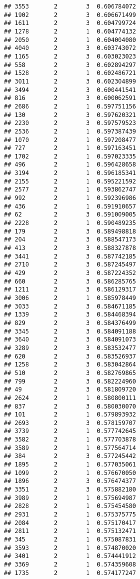 \documentclass[
]{article}
\begin{document}
\begin{verbatim}
## 3553       2        3  0.606784072
## 1902       2        3  0.606671499
## 1611       2        3  0.604799724
## 1278       2        1  0.604774132
## 2050       2        1  0.604004080
## 4040       2        3  0.603743072
## 1165       2        3  0.603023023
## 558        2        3  0.602894297
## 1528       2        1  0.602486721
## 3011       2        3  0.602304899
## 3494       2        3  0.600441541
## 816        2        3  0.600062591
## 2686       2        1  0.597751156
## 130        2        3  0.597620321
## 2230       2        3  0.597579523
## 2536       2        1  0.597387439
## 1070       2        1  0.597208477
## 727        2        1  0.597163451
## 1702       2        1  0.597023335
## 496        2        1  0.596428658
## 3194       2        1  0.596185341
## 2155       2        1  0.595221592
## 2577       2        1  0.593862747
## 992        2        1  0.592396986
## 436        2        1  0.591910657
## 62         2        3  0.591009005
## 2228       2        1  0.590489235
## 179        2        3  0.589498818
## 204        2        3  0.588547173
## 413        2        3  0.588327878
## 3441       2        3  0.587742185
## 2710       2        3  0.587245497
## 429        2        3  0.587224352
## 660        2        3  0.586285765
## 1211       2        3  0.586129317
## 3006       2        1  0.585978449
## 3033       2        3  0.584671185
## 1339       2        3  0.584468394
## 829        2        3  0.584376499
## 3345       2        3  0.584091188
## 3640       2        3  0.584091073
## 3289       2        3  0.583532477
## 620        2        3  0.583526937
## 1258       2        3  0.583042864
## 510        2        3  0.582769865
## 799        2        3  0.582224960
## 49         2        3  0.581809720
## 2624       2        1  0.580800111
## 837        2        3  0.580030070
## 101        2        1  0.579893932
## 2693       2        3  0.578159707
## 3739       2        1  0.577742645
## 3582       2        1  0.577703878
## 3589       2        1  0.577564714
## 384        2        3  0.577245442
## 1895       2        1  0.577035061
## 1099       2        1  0.576670050
## 1896       2        3  0.576474377
## 3351       2        3  0.575882180
## 3989       2        1  0.575694987
## 2828       2        1  0.575454580
## 2931       2        1  0.575375775
## 2084       2        1  0.575170417
## 2811       2        1  0.575132471
## 345        2        1  0.575087831
## 3593       2        1  0.574870020
## 3401       2        1  0.574441912
## 3369       2        1  0.574359608
## 1735       2        1  0.574177247

\end{verbatim}
\end{document}
